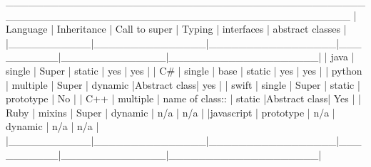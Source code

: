 ______________________________________________________________________________________________
|  Language |  Inheritance  |  Call to super  |  Typing  |  interfaces  |  abstract classes  |
|___________|_______________|_________________|__________|______________|____________________|
|    java   |    single     |     Super       |  static  |    yes       |      yes           |
|     C#    |    single     |     base        |  static  |    yes       |      yes           |  
|   python  |    multiple   |     Super       | dynamic  |Abstract class|      yes           |
|   swift   |    single     |     Super       |  static  |   prototype  |      No            |
|    C++    |    multiple   | name of class:: |  static  |Abstract class|      Yes           |
|   Ruby    |    mixins     |      Super      |  dynamic |     n/a      |      n/a           |
|javascript |   prototype   |      n/a        |  dynamic |     n/a      |      n/a           |
|___________|_______________|_________________|__________|______________|____________________|

